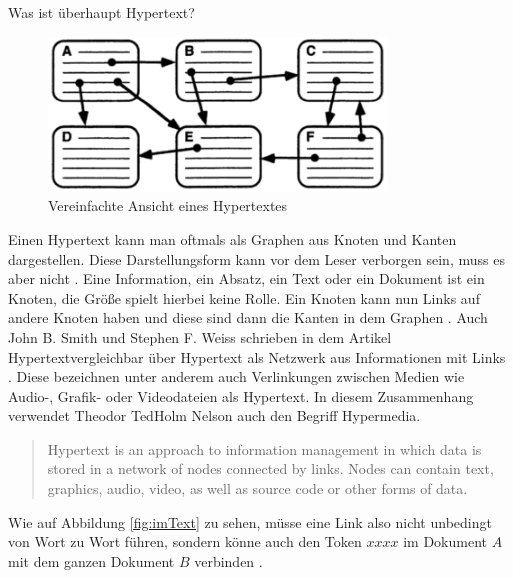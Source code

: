 \begin{section}{Was ist überhaupt Hypertext?}
\begin{figure}[H]
	\centering
	\includegraphics[width=0.8\textwidth]{image/nielsenLink}
	\caption{Vereinfachte Ansicht eines Hypertextes \cite[S.1]{Nielsen1995}}
	\label{fig:nielsenLink}
\end{figure}

Einen Hypertext kann man oftmals als Graphen aus Knoten und Kanten dargestellen. Diese Darstellungsform kann vor dem Leser verborgen sein, muss es aber nicht \cite{Conklin1987}. Eine Information, ein Absatz, ein Text oder ein Dokument ist ein Knoten, die Größe spielt hierbei keine Rolle. Ein Knoten kann nun Links auf andere Knoten haben und diese sind dann die Kanten in dem Graphen \cite[S.19]{Conklin1987} \cite[S.2]{Nielsen1995}. Auch John B. Smith und Stephen F. Weiss schrieben in dem Artikel \glqq Hypertext\grqq{ }vergleichbar über Hypertext als Netzwerk aus Informationen mit Links \cite{Smith1988}. Diese bezeichnen unter anderem auch Verlinkungen zwischen Medien wie Audio-, Grafik- oder Videodateien als Hypertext. In diesem Zusammenhang verwendet Theodor \glqq Ted\grqq{ }Holm Nelson auch den Begriff \glqq Hypermedia\grqq{ }\cite{Nelson1965}.

\begin{quote}
    \glqq [...] Hypertext is an approach to information management in which data is stored in a network of nodes connected by links. Nodes can contain text, graphics, audio, video, as well as source code or other forms of data.\grqq{ }\cite{Smith1988}
\end{quote}

Wie auf Abbildung \ref{fig:imText} zu sehen, müsse eine Link also nicht unbedingt von Wort zu Wort führen, sondern könne auch den Token $xxxx$ im Dokument $A$ mit dem ganzen Dokument $B$ verbinden \cite{Conklin1987}. 


\end{section}
